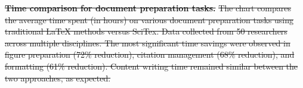 \documentclass[preprint,review,12pt]{elsarticle}%
\providecommand{\DIFdeltex}[1]{{\protect\color{red}\sout{#1}}}                      %
\providecommand{\DIFdelFL}[1]{\DIFdel{#1}} %
\providecommand{\DIFdel}[1]{\texorpdfstring{\DIFdeltex{#1}}{}} %
\begin{document}
\begin{frontmatter}



{%
\textbf{\DIFdelFL{Time comparison for document preparation tasks.}} %
\DIFdelFL{The chart compares the average time spent (in hours) on various document preparation tasks using traditional LaTeX methods versus SciTex. Data collected from 50 researchers across multiple disciplines. The most significant time savings were observed in figure preparation (72\% reduction), citation management (68\% reduction), and formatting (61\% reduction). Content writing time remained similar between the two approaches, as expected.}}


\end{frontmatter}
\end{document}

